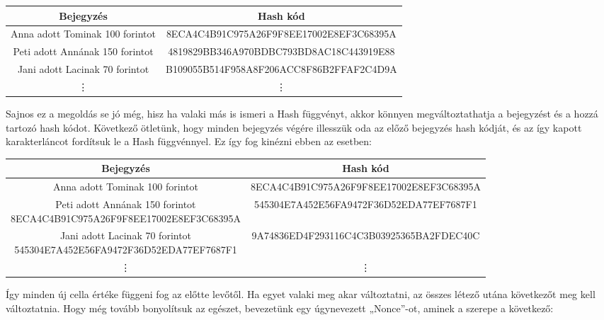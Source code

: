 \documentclass[11pt,a4paper]{article}
\newcommand{\q}[1]{„#1''} %
\begin{document}
\begin{center}
\begin{tabular}{c|c}
Bejegyzés & Hash kód \\
\hline \hline
Anna adott Tominak 100 forintot & \scriptsize{8ECA4C4B91C975A26F9F8EE17002E8EF3C68395A} \\
\hline
Peti adott Annának 150 forintot & \scriptsize{4819829BB346A970BDBC793BD8AC18C443919E88} \\
\hline
Jani adott Lacinak 70 forintot & \scriptsize{B109055B514F958A8F206ACC8F86B2FFAF2C4D9A} \\ 
\hline
\vdots & \vdots
\end{tabular}
\end{center}

\noindent Sajnos ez a megoldás se jó még, hisz ha valaki más is ismeri a Hash függvényt, akkor könnyen megváltoztathatja a bejegyzést és a hozzá tartozó hash kódot. Következő ötletünk, hogy minden bejegyzés végére illesszük oda az előző bejegyzés hash kódját, és az így kapott karakterláncot fordítsuk le a Hash függvénnyel. Ez így fog kinézni ebben az esetben:

\begin{center}
\begin{tabular}{c|c}
Bejegyzés & Hash kód \\
\hline \hline
Anna adott Tominak 100 forintot & \scriptsize{8ECA4C4B91C975A26F9F8EE17002E8EF3C68395A} \\
\hline
\makecell{Peti adott Annának 150 forintot \\ \scriptsize{8ECA4C4B91C975A26F9F8EE17002E8EF3C68395A}} & \scriptsize{545304E7A452E56FA9472F36D52EDA77EF7687F1} \\
\hline
\makecell{Jani adott Lacinak 70 forintot \\ \scriptsize{545304E7A452E56FA9472F36D52EDA77EF7687F1}} & \scriptsize{9A74836ED4F293116C4C3B03925365BA2FDEC40C} \\ 
\hline
\vdots & \vdots
\end{tabular}
\end{center}

\noindent Így minden új cella értéke függeni fog az előtte levőtől. Ha egyet valaki meg akar változtatni, az összes létező utána következőt meg kell változtatnia. Hogy még tovább bonyolítsuk az egészet, bevezetünk egy úgynevezett \q{Nonce}-ot, aminek a szerepe a következő:
\end{document}
